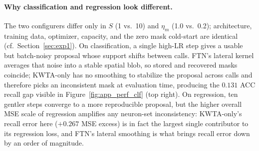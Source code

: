 \documentclass{article}
\begin{document}
\paragraph{Why classification and regression look different.}
The two configurers differ only in $S$ (1 vs.\ 10) and $\eta_m$ (1.0 vs.\ 0.2); architecture, training data, optimizer, capacity, and the zero mask cold-start are identical (cf.\ Section~\ref{sec:exp1}). On classification, a single high-LR step gives a usable but batch-noisy proposal whose support shifts between calls. FTN's lateral kernel averages that noise into a stable spatial blob, so stored and recovered masks coincide; KWTA-only has no smoothing to stabilize the proposal across calls and therefore picks an inconsistent mask at evaluation time, producing the $0.131$ ACC recall gap visible in Figure~\ref{fig:app_perf_clf} (top right). On regression, ten gentler steps converge to a more reproducible proposal, but the higher overall MSE scale of regression amplifies any neuron-set inconsistency: KWTA-only's recall error here ($+0.267$ MSE excess) is in fact the largest single contributor to its regression loss, and FTN's lateral smoothing is what brings recall error down by an order of magnitude.
\end{document}
